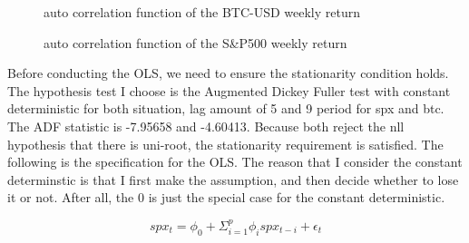 \documentclass{article}
\begin{document}
\newpage

\begin{figure}[h]
	\centering
	
	\caption{auto correlation function of the BTC-USD weekly return}
\end{figure}


\begin{figure}[h]
	\centering
	
	\caption{auto correlation function of the S\&P500 weekly return}
\end{figure}

\newpage

Before conducting the OLS, we need to ensure the stationarity condition
holds. The hypothesis test I choose is the Augmented Dickey Fuller test with 
constant deterministic for both situation, lag amount of 5 and 9 period for spx and btc.
The ADF statistic is -7.95658 and -4.60413. Because both reject the nll
hypothesis that there is uni-root, the stationarity requirement is satisfied. The 
following is the specification for the OLS. The reason that I consider the constant 
determinstic is that I first make the assumption, and then decide whether to lose 
it or not. After all, the 0 is just the special case for the constant deterministic.

$$
spx_t = \phi_0 + \Sigma_{i=1}^p \phi_i spx_{t-i} + \epsilon_t
$$
\end{document}

